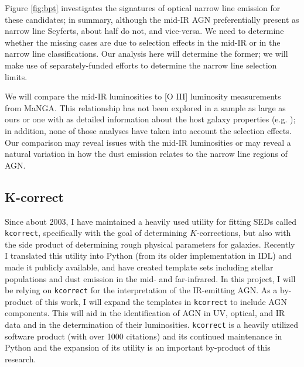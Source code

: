 \documentclass[12pt, preprint]{hacked-aastex}
\begin{document}
Figure \ref{fig:bpt} investigates the signatures of optical narrow
line emission for these candidates; in summary, although the mid-IR
AGN preferentially present as narrow line Seyferts, about half do not,
and vice-versa. We need to determine whether the missing cases are due
to selection effects in the mid-IR or in the narrow line
classifications. Our analysis here will determine the former; we will
make use of separately-funded efforts to determine the narrow line
selection limits. 

We will compare the mid-IR luminosities to [O III] luminosity
measurements from MaNGA. This relationship has not been explored in a
sample as large as ours or one with as detailed information about the
host galaxy properties (e.g. \cite{lamassa12a}); in addition, none of
those analyses have taken into account the selection effects. Our
comparison may reveal issues with the mid-IR luminosities or may
reveal a natural variation in how the dust emission relates to the
narrow line regions of AGN. 

\subsection{K-correct}

Since about 2003, I have maintained a heavily used utility for fitting
SEDs called {\tt kcorrect}, specifically with the goal of determining
$K$-corrections, but also with the side product of determining rough
physical parameters for galaxies. Recently I translated this utility
into Python (from its older implementation in IDL) and made it
publicly available, and have created template sets including stellar
populations and dust emission in the mid- and far-infrared.  In this
project, I will be relying on {\tt kcorrect} for the interpretation of
the IR-emitting AGN. As a by-product of this work, I will expand the
templates in {\tt kcorrect} to include AGN components. This will aid
in the identification of AGN in UV, optical, and IR data and in the
determination of their luminosities.  {\tt kcorrect} is a heavily
utilized software product (with over 1000 citations) and its continued
maintenance in Python and the expansion of its utility is an important
by-product of this research.
\end{document}
